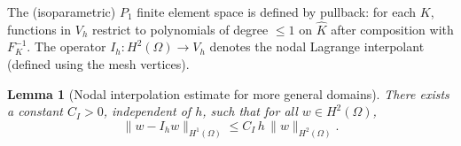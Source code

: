 \documentclass[11pt,a4paper]{article}
\numberwithin{equation}{section}
\newtheorem{lemma}[theorem]{Lemma}
\theoremstyle{definition}
\newcommand{\1}{\mathbbm{1}}
\begin{document}
The (isoparametric) $P_1$ finite element space is defined by pullback: for each $K$, functions in $V_h$
restrict to polynomials of degree $\le 1$ on $\widehat K$ after composition with $F_K^{-1}$.
The operator $I_h:H^2(\Omega)\to V_h$ denotes the nodal Lagrange interpolant (defined using the mesh vertices).












\begin{lemma}[Nodal interpolation estimate for more general domains]
\label{lem:app-interp}
There exists a constant $C_I>0$, independent of $h$, such that for all $w\in H^2(\Omega)$,
\begin{equation}
\label{eq:app-interp}
\|w-I_h w\|_{H^1(\Omega)} \le C_I\, h\,\|w\|_{H^2(\Omega)}.
\end{equation}
\end{lemma}
\end{document}
